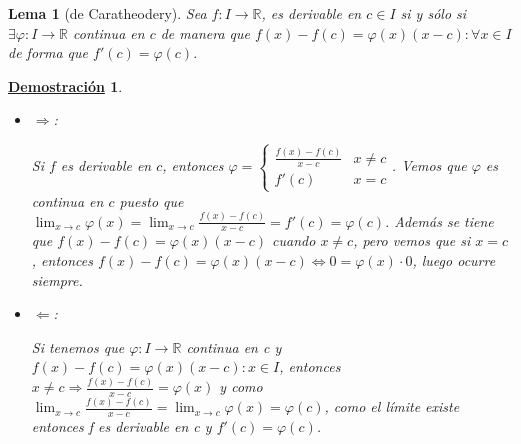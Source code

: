 \documentclass[10pt,a4paper,openright]{book}
\theoremstyle{break}
\newtheorem{lema}{Lema}[chapter]
\newtheorem*{demo}{\underline{Demostración}}
\begin{document}
\begin{lema}[de Caratheodery]
Sea $f:I \rightarrow \mathbb R$, es derivable en $c\in I$ si y sólo si $\exists\varphi: I\rightarrow \mathbb R$ continua en $c$ de manera que $f(x)-f(c)=\varphi(x)(x-c): \forall x \in I$ de forma que $f'(c)=\varphi(c)$.
\end{lema}
\begin{demo}
\begin{itemize}
\item $\Rightarrow$:

Si $f$ es derivable en $c$, entonces $\varphi=\begin{cases} \frac{f(x)-f(c)}{x-c} & x\neq c \\ f'(c) & x=c\end{cases}$. Vemos que $\varphi$ es continua en $c$ puesto que $\lim_{x\rightarrow c}\varphi(x) = \lim_{x\rightarrow c} \frac{f(x)-f(c)}{x-c}=f'(c)=\varphi(c)$. Además se tiene que $f(x)-f(c)=\varphi(x)(x-c)$ cuando $x\neq c$, pero vemos que si $x=c$, entonces $f(x)-f(c)=\varphi(x)(x-c)\Leftrightarrow 0=\varphi(x)\cdot 0$, luego ocurre siempre.

\item $\Leftarrow$:

Si tenemos que $\varphi: I \rightarrow \mathbb R$ continua en c y $f(x)-f(c)=\varphi(x)(x-c) : x\in I$, entonces $x\neq c\Rightarrow \frac{f(x)-f(c)}{x-c}=\varphi(x)$ y como $\lim_{x\rightarrow c}\frac{f(x)-f(c)}{x-c} = \lim_{x\rightarrow c} \varphi(x)=\varphi(c)$, como el límite existe entonces f es derivable en c y $f'(c)=\varphi(c)$.
\end{itemize}
\end{demo}
\end{document}
